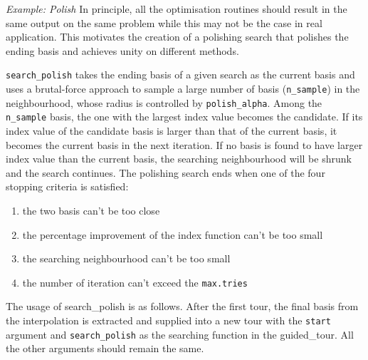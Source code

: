 \documentclass[12pt]{article}
\providecommand{\tightlist}{%
  \setlength{\itemsep}{0pt}\setlength{\parskip}{0pt}}
\begin{document}
\emph{Example: Polish} In principle, all the optimisation routines
should result in the same output on the same problem while this may not
be the case in real application. This motivates the creation of a
polishing search that polishes the ending basis and achieves unity on
different methods.

\texttt{search\_polish} takes the ending basis of a given search as the
current basis and uses a brutal-force approach to sample a large number
of basis (\texttt{n\_sample}) in the neighbourhood, whose radius is
controlled by \texttt{polish\_alpha}. Among the \texttt{n\_sample}
basis, the one with the largest index value becomes the candidate. If
its index value of the candidate basis is larger than that of the
current basis, it becomes the current basis in the next iteration. If no
basis is found to have larger index value than the current basis, the
searching neighbourhood will be shrunk and the search continues. The
polishing search ends when one of the four stopping criteria is
satisfied:

\begin{enumerate}
\def\labelenumi{\arabic{enumi})}
\tightlist
\item
  the two basis can't be too close
\item
  the percentage improvement of the index function can't be too small
\item
  the searching neighbourhood can't be too small
\item
  the number of iteration can't exceed the \texttt{max.tries}
\end{enumerate}

The usage of search\_polish is as follows. After the first tour, the
final basis from the interpolation is extracted and supplied into a new
tour with the \texttt{start} argument and \texttt{search\_polish} as the
searching function in the guided\_tour. All the other arguments should
remain the same.
\end{document}
